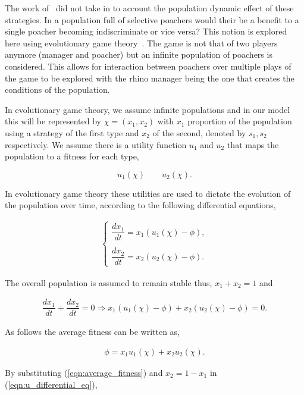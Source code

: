 \documentclass[10pt]{article}
\begin{document}
The work of~\cite{Lee} did not take in to account the population dynamic effect
of  these strategies. In a population full of selective poachers would their be 
a benefit to a single poacher becoming indiscriminate or vice versa? This notion 
is explored here using evolutionary game theory~\cite{Smith}. The 
game is not that of two players anymore (manager and poacher) but an infinite
population of poachers is considered. This allows for interaction between poachers
over multiple plays of the game to be explored with the rhino manager being the
one that creates the conditions of the population. 

In evolutionary game theory, we assume infinite populations and in our
model this will be represented by \(\chi=(x_1, x_2)\) with \(x_1\) proportion of the
population using a strategy of the first type and \(x_2\) of the second, denoted
by \(s_1, s_2\) respectively. We assume there is a utility function \(u_1\) and 
\(u_2\) that maps the population to a fitness for each type,

\[ u_1(\chi)  \qquad u_2(\chi).\] 

In evolutionary game theory these utilities are used to dictate the evolution of
the population over time, according to the following differential equations,

\begin{eqnarray}
	\label{eqn:u_differential_eq}
	\left\{
	\begin{array}{cl}
	\dfrac{dx_1}{dt}=x_1(u_1(\chi)-\phi),
	\\
	\\
	\dfrac{dx_2}{dt}= x_2(u_2(\chi)-\phi).
	\end{array} \right.
\end{eqnarray}

The overall population is assumed to remain stable thus, \(x_1 + x_2 = 1 \)
and

\begin{eqnarray}
	\dfrac{dx_1}{dt}  + \dfrac{dx_2}{dt} = 0 \Rightarrow x_1(u_1(\chi) - \phi)
	 + x_2(u_2(\chi) - \phi)=0.
\end{eqnarray} 

As follows the average fitness can be written as,

\begin{eqnarray}
\label{eqn:average_fitness}
	\phi=x_1u_1(\chi) + x_2u_2(\chi).
\end{eqnarray}

By substituting (\ref{eqn:average_fitness}) and \(x_2= 1 - x_1\) in (\ref{eqn:u_differential_eq}),
\end{document}
